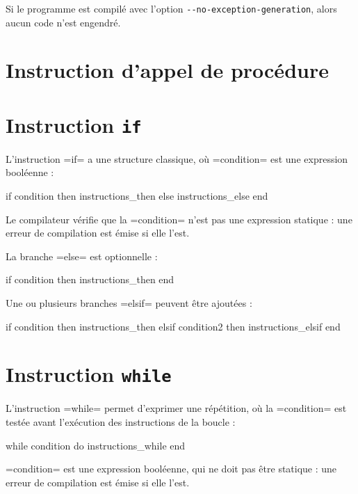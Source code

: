 Si le programme est compilé avec l'option \texttt{-{}-no-exception-generation}, alors aucun code n'est engendré.




\section{Instruction d'appel de procédure}




\section{Instruction \texttt{if}}

L'instruction \plm=if= a une structure classique, où \plm=condition= est une expression booléenne :
\begin{PLM}
if condition then
  instructions_then
else
  instructions_else
end
\end{PLM}

Le compilateur vérifie que la \plm=condition= n'est pas une expression statique : une erreur de compilation est émise si elle l'est.

La branche \plm=else= est optionnelle :
\begin{PLM}
if condition then
  instructions_then
end
\end{PLM}


Une ou plusieurs branches \plm=elsif= peuvent être ajoutées :
\begin{PLM}
if condition then
  instructions_then
elsif condition2 then
  instructions_elsif
end
\end{PLM}






\section{Instruction \texttt{while}}

L'instruction \plm=while= permet d'exprimer une répétition, où la \plm=condition= est testée avant l'exécution des instructions de la boucle :
\begin{PLM}
while condition do
  instructions_while
end
\end{PLM}

\plm=condition= est une expression booléenne, qui ne doit pas être statique : une erreur de compilation est émise si elle l'est.

